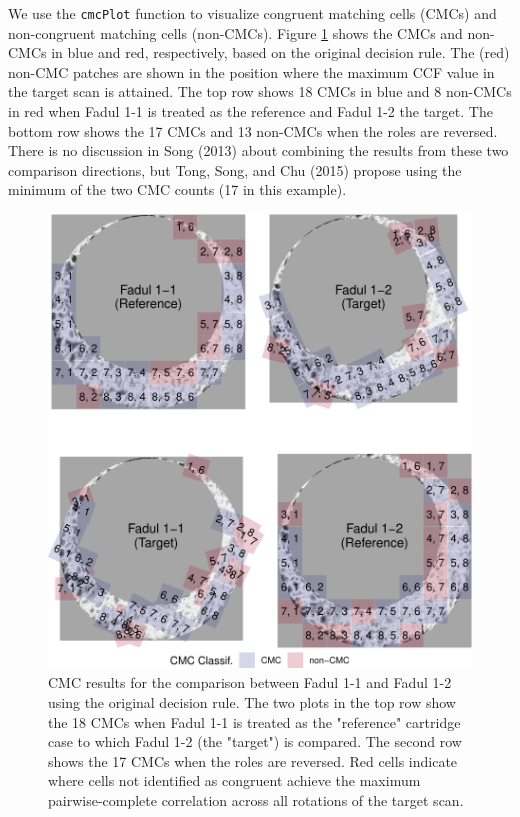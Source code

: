 We use the \texttt{cmcPlot} function to visualize congruent matching cells (CMCs) and non-congruent matching cells (non-CMCs).
Figure \ref{fig:topVoteCMCPlot} shows the CMCs and non-CMCs in blue and red, respectively, based on the original decision rule.
The (red) non-CMC patches are shown in the position where the maximum CCF value in the target scan is attained.
The top row shows 18 CMCs in blue and 8 non-CMCs in red when Fadul 1-1 is treated as the reference and Fadul 1-2 the target.
The bottom row shows the 17 CMCs and 13 non-CMCs when the roles are reversed.
There is no discussion in Song (2013) about combining the results from these two comparison directions, but Tong, Song, and Chu (2015) propose using the minimum of the two CMC counts (17 in this example).

\begin{figure}[htbp]

{\centering \includegraphics[width=\textwidth]{figures/kmOriginalMethod} 

}

\caption{CMC results for the comparison between Fadul 1-1 and Fadul 1-2 using the original decision rule. The two plots in the top row show the 18 CMCs when Fadul 1-1 is treated as the "reference" cartridge case to which Fadul 1-2 (the "target") is compared. The second row shows the 17 CMCs when the roles are reversed. Red cells indicate where cells not identified as congruent achieve the maximum pairwise-complete correlation across all rotations of the target scan.}\label{fig:topVoteCMCPlot}
\end{figure}

